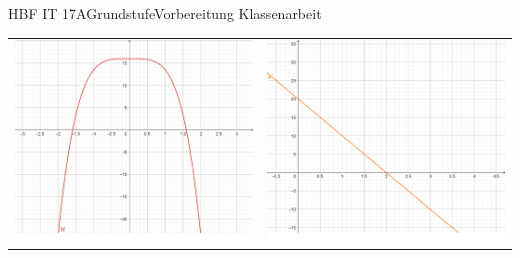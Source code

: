 \documentclass[oneside,openany,headings=optiontotoc,11pt,numbers=noenddot]{scrreprt}
\begin{document}
\begin{worksheet}{HBF IT 17A}{Grundstufe}{Vorbereitung Klassenarbeit}
\begin{framed}
\begin{tabularx}{\textwidth}{X|X}
				\includegraphics[scale=0.25]{Bilder/KAUebungBilder/f2.png} &
				\includegraphics[scale=0.25]{Bilder/KAUebungBilder/m2.png}\\

\end{tabularx}
\end{framed}
\end{worksheet}
\end{document}
